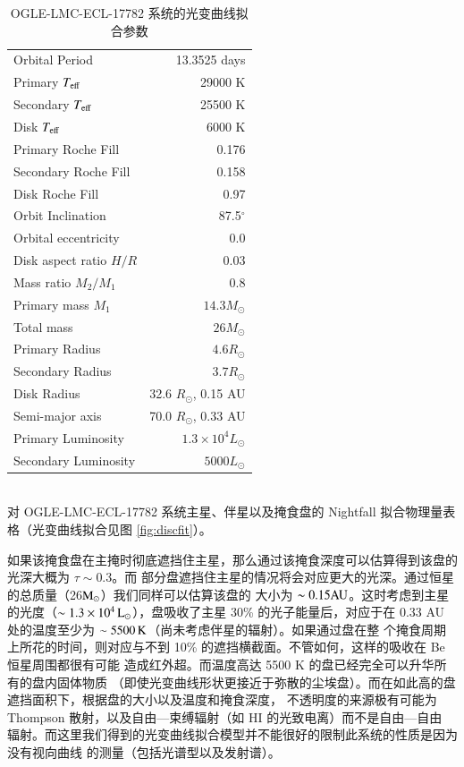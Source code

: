 {\renewcommand{\arraystretch}{1.4}
\begin{table}
\caption{OGLE-LMC-ECL-17782 系统的光变曲线拟合参数}
\label{tbl:discparam}
\centering
\begin{tabularx}{0.9\textwidth}{@{\extracolsep{\fill}}lr}
\hline
Orbital Period & 13.3525 days \\
Primary $T_\mathrm{eff}$  & 29000  K  \\
Secondary $T_\mathrm{eff}$  & 25500 K   \\
Disk $T_\mathrm{eff}$  & 6000 K  \\
Primary Roche Fill & 0.176\\
Secondary Roche Fill & 0.158\\
Disk  Roche Fill & 0.97 \\
Orbit Inclination & 87.5$^\circ$ \\
Orbital eccentricity & 0.0 \\
Disk aspect ratio $H/R$  & 0.03 \\
Mass ratio $M_2/M_1$ & 0.8 \\
Primary mass $M_1$     &  $14.3 M_\odot$ \\
Total mass  & $26 M_\odot$ \\
Primary Radius  & $4.6 R_\odot$ \\
Secondary Radius & $3.7 R_\odot$ \\
Disk Radius  & 32.6 $R_\odot$, 0.15 AU \\
Semi-major axis & 70.0 $R_\odot$, 0.33 AU \\
Primary Luminosity & $1.3 \times 10^4 L_\odot $\\ 
Secondary Luminosity & $5000 L_\odot $\\ 
\hline
\end{tabularx}
\medskip \\
对 OGLE-LMC-ECL-17782 系统主星、伴星以及掩食盘的 Nightfall 拟合物理量表格（光变曲线拟合见图 \ref{fig:discfit}）。
\end{table}
}

如果该掩食盘在主掩时彻底遮挡住主星，那么通过该掩食深度可以估算得到该盘的光深大概为 $\tau \sim 0.3$。而
部分盘遮挡住主星的情况将会对应更大的光深。通过恒星的总质量（26$\mathrm{M}_\odot$）我们同样可以估算该盘的
大小为 $\sim 0.15\mathrm{AU}$。这时考虑到主星的光度（$\sim  1.3\times 10^4\,\rm{L_\odot}$），盘吸收了主星 30\% 
的光子能量后，对应于在 0.33 AU 处的温度至少为 $\sim 5500\,\mathrm{K}$（尚未考虑伴星的辐射）。如果通过盘在整
个掩食周期上所花的时间，则对应与不到 10\% 的遮挡横截面。不管如何，这样的吸收在 Be 恒星周围都很有可能
造成红外超\cite{Waters1988,Dougherty1994}。而温度高达 5500 K 的盘已经完全可以升华所有的盘内固体物质
（即使光变曲线形状更接近于弥散的尘埃盘）。而在如此高的盘遮挡面积下，根据盘的大小以及温度和掩食深度，
不透明度的来源极有可能为 Thompson 散射，以及自由---束缚辐射（如 H\textsc{I} 的光致电离）而不是自由---自由
辐射\cite{Rivinius2013}。而这里我们得到的光变曲线拟合模型并不能很好的限制此系统的性质是因为没有视向曲线
的测量（包括光谱型以及发射谱）。

